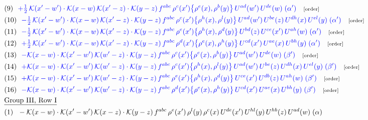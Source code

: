 \documentclass[9pt]{article}
\begin{document}
\begin{align}
&\quad\text{(9)}\ \ \textcolor{blue}{+\tfrac12\,\mathcal{K}(x'-w')\cdot\mathcal{K}(x-w)\,\mathcal{K}(x'-z)\cdot\mathcal{K}(y-z)\, f^{abc}\,\rho^{c}(x')\big\{\rho^{e}(x),\rho^{b}(y)\big\}\,U^{ad}(w')\,U^{de}(w)\;(\alpha')}\quad\text{\scriptsize[order]}\notag\\
&\quad\text{(10)}\ \ \textcolor{blue}{-\tfrac12\,\mathcal{K}(x'-w')\cdot\mathcal{K}(x-w)\,\mathcal{K}(x'-z)\cdot\mathcal{K}(y-z)\, f^{abc}\,\rho^{c}(x')\big\{\rho^{h}(x),\rho^{l}(y)\big\}\,U^{ad}(w')\,U^{be}(z)\,U^{dh}(x)\,U^{el}(y)\;(\alpha')}\quad\text{\scriptsize[order]}\notag\\
&\quad\text{(11)}\ \ \textcolor{blue}{-\tfrac12\,\mathcal{K}(x'-w')\cdot\mathcal{K}(x-w)\,\mathcal{K}(x'-z)\cdot\mathcal{K}(y-z)\, f^{abc}\,\rho^{e}(x')\big\{\rho^{h}(x),\rho^{d}(y)\big\}\,U^{bd}(z)\,U^{ce}(x')\,U^{ah}(w)\;(\alpha')}\quad\text{\scriptsize[order]}\notag\\
&\quad\text{(12)}\ \ \textcolor{blue}{+\tfrac12\,\mathcal{K}(x'-w')\cdot\mathcal{K}(x-w)\,\mathcal{K}(x'-z)\cdot\mathcal{K}(y-z)\, f^{abc}\,\rho^{d}(x')\big\{\rho^{e}(x),\rho^{h}(y)\big\}\,U^{cd}(x')\,U^{ae}(x)\,U^{bh}(y)\;(\alpha')}\quad\text{\scriptsize[order]}\notag\\
&\quad\text{(13)}\ \ \textcolor{blue}{-\mathcal{K}(x-w)\cdot\mathcal{K}(x'-w')\,\mathcal{K}(w'-z)\cdot\mathcal{K}(y-z)\, f^{abc}\,\rho^{c}(x')\big\{\rho^{e}(x),\rho^{b}(y)\big\}\,U^{ad}(w')\,U^{de}(w)\;(\beta')}\quad\text{\scriptsize[order]}\notag\\
&\quad\text{(14)}\ \ \textcolor{blue}{+\mathcal{K}(x-w)\cdot\mathcal{K}(x'-w')\,\mathcal{K}(w'-z)\cdot\mathcal{K}(y-z)\, f^{abc}\,\rho^{c}(x')\big\{\rho^{h}(x),\rho^{l}(y)\big\}\,U^{ad}(w')\,U^{be}(z)\,U^{dh}(x)\,U^{el}(y)\;(\beta')}\quad\text{\scriptsize[order]}\notag\\
&\quad\text{(15)}\ \ \textcolor{blue}{+\mathcal{K}(x-w)\cdot\mathcal{K}(x'-w')\,\mathcal{K}(w'-z)\cdot\mathcal{K}(y-z)\, f^{abc}\,\rho^{e}(x')\big\{\rho^{h}(x),\rho^{d}(y)\big\}\,U^{ce}(x')\,U^{db}(z)\,U^{ah}(w)\;(\beta')}\quad\text{\scriptsize[order]}\notag\\
&\quad\text{(16)}\ \ \textcolor{blue}{-\mathcal{K}(x-w)\cdot\mathcal{K}(x'-w')\,\mathcal{K}(w'-z)\cdot\mathcal{K}(y-z)\, f^{abc}\,\rho^{d}(x')\big\{\rho^{e}(x),\rho^{h}(y)\big\}\,U^{cd}(x')\,U^{ae}(x)\,U^{bh}(y)\;(\beta')}\quad\text{\scriptsize[order]}\notag\\
&\quad\underline{\text{Group III, Row I}}\notag\\
&\quad\text{(1)}\ \ -\mathcal{K}(x-w)\cdot \mathcal{K}(x'-w')\, \mathcal{K}(x-z)\cdot \mathcal{K}(y-z)\, f^{abc}\, \rho^{e}(x')\,\rho^{l}(y)\,\rho^{c}(x)\,U^{de}(x')\,U^{hl}(y)\,U^{hb}(z)\,U^{ad}(w)\;(\alpha)\notag\\

\end{align}
\end{document}
